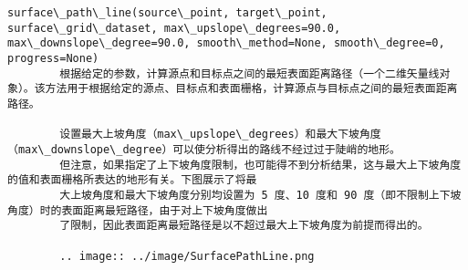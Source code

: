 \documentclass[11pt]{article}
\begin{document}
\begin{Verbatim}[commandchars=\\\{\}]
    surface\_path\_line(source\_point, target\_point, surface\_grid\_dataset, max\_upslope\_degrees=90.0, max\_downslope\_degree=90.0, smooth\_method=None, smooth\_degree=0, progress=None)
        根据给定的参数，计算源点和目标点之间的最短表面距离路径（一个二维矢量线对象）。该方法用于根据给定的源点、目标点和表面栅格，计算源点与目标点之间的最短表面距离路径。
        
        设置最大上坡角度（max\_upslope\_degrees）和最大下坡角度（max\_downslope\_degree）可以使分析得出的路线不经过过于陡峭的地形。
        但注意，如果指定了上下坡角度限制，也可能得不到分析结果，这与最大上下坡角度的值和表面栅格所表达的地形有关。下图展示了将最
        大上坡角度和最大下坡角度分别均设置为 5 度、10 度和 90 度（即不限制上下坡角度）时的表面距离最短路径，由于对上下坡角度做出
        了限制，因此表面距离最短路径是以不超过最大上下坡角度为前提而得出的。
        
        .. image:: ../image/SurfacePathLine.png
        

\end{Verbatim}
\end{document}
